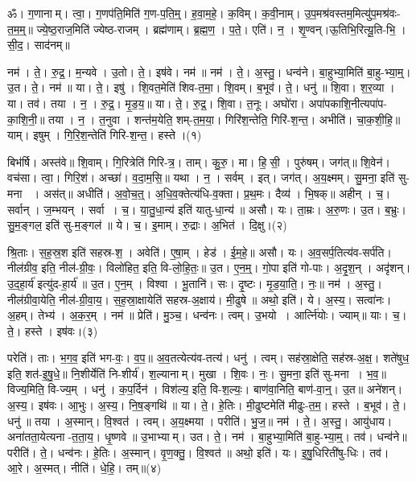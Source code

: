 
ॐ। ग॒णानाम्। त्वा॒। ग॒णप॑ति॒मिति॑ ग॒ण-प॒ति॒म्॒। ह॒वा॒म॒हे॒। क॒विम्। क॒वी॒नाम्। उ॒प॒मश्र॑वस्तम॒मित्यु॑प॒मश्र॑वः-त॒म॒म्॒॥ 
ज्ये॒ष्ठ॒राज॒मिति॑ ज्येष्ठ-राजम्। ब्रह्म॑णाम्। ब्र॒ह्म॒ण॒। प॒ते॒। एति॑। न॒। शृ॒ण्वन्।ऊ॒तिभि॒रित्यू॒ति-भि॒। सी॒द॒। साद॑नम्॥ 


नम॑। ते॒। रु॒द्र॒। म॒न्यवे। उ॒तो। ते॒। इष॑वे। नम॑॥ नम॑। ते॒। अ॒स्तु॒। धन्व॑ने। बा॒हुभ्या॒मिति॑ बा॒हु-भ्या॒म्॒। उ॒त। ते॒। नम॑॥ या। ते॒। इषु॑। शि॒वत॒मेति॑ शिव-त॒मा॒। शि॒वम्। ब॒भूव॑। ते॒। धनु॑॥ शि॒वा। श॒र॒व्या। या। तव॑। तया। न॒। रु॒द्र॒। मृ॒ड॒य॒॥ या। ते॒। रु॒द्र॒। शि॒वा। त॒नूः। अघो॑रा। अपा॑पकाशि॒नीत्यपा॑प-का॒शि॒नी॒॥ तया। न॒। त॒नुवा। शन्त॑म॒येति॒ शम्-त॒म॒या॒। गिरि॑श॒न्तेति॒ गिरि॑-श॒न्त॒। अभीति॑। चा॒क॒शी॒हि॒॥ याम्। इषुम्। गि॒रि॒श॒न्तेति॑ गिरि-श॒न्त॒। हस्ते।(१)


बिभ॑र्षि। अस्त॑वे॥ शि॒वाम्। गि॒रित्रेति॑ गिरि-त्र॒। ताम्। कु॒रु॒। मा। हि॒सी॒। पुरु॑षम्। जग॑त्॥ शि॒वेन॑। वच॑सा। त्वा॒। गिरि॒श॑। अच्छा॑। व॒दा॒म॒सि॒॥ यथा। न॒। सर्वम्। इत्। जग॑त्। अ॒य॒क्ष्मम्। सु॒मना॒ इति॑ सु-मना । अस॑त्॥ अधीति॑। अ॒वो॒च॒त्॒। अ॒धि॒व॒क्तेत्य॑धि-व॒क्ता। प्र॒थ॒मः। दैव्य॑। भि॒षक्॥ अहीन्। च॒। सर्वान्। ज॒म्भयन्। सर्वा। च॒। या॒तु॒धा॒न्य॑ इति॑ यातु-धा॒न्य॑॥ असौ। यः। ता॒म्रः। अ॒रु॒णः। उ॒त। ब॒भ्रुः। सु॒म॒ङ्गल॒ इति॑ सु-म॒ङ्गल॑॥ ये। च॒। इ॒माम्। रु॒द्राः। अ॒भित॑। दि॒क्षु।(२)


श्रि॒ताः। स॒ह॒स्र॒श इति॑ सहस्र-श॒। अवेति॑। ए॒षा॒म्। हेड॑। ई॒म॒हे॒॥ असौ। यः। अ॒व॒सर्प॒तित्य॑व-सर्प॑ति। नील॑ग्रीव॒ इति॒ नील॑-ग्री॒वः॒। विलो॑हित॒ इति॒ वि-लो॒हि॒तः॒॥ उ॒त। ए॒न॒म्॒। गो॒पा इति॑ गो-पाः। अ॒दृ॒श॒न्। अदृ॑शन्। उ॒द॒हा॒र्य॑ इत्यु॑द-हा॒र्य॑॥ उ॒त। ए॒न॒म्। विश्वा। भू॒तानि॑। सः। दृ॒ष्टः। मृ॒ड॒या॒ति॒। नः॒॥ नम॑। अ॒स्तु॒। नील॑ग्रीवा॒येति॒ नील॑-ग्री॒वा॒य॒। स॒ह॒स्रा॒क्षायेति॑ सहस्र-अ॒क्षाय॑। मी॒ढुषे॥ अथो॒ इति॑। ये। अ॒स्य॒। सत्वा॑नः। अ॒हम्। तेभ्य॑। अ॒क॒र॒म्। नम॑॥ प्रेति॑। मु॒ञ्च॒। धन्व॑नः। त्वम्। उ॒भयो। आर्त्नि॑योः। ज्याम्॥ याः। च॒। ते॒। हस्ते। इष॑वः।(३)


परेति॑। ताः। भ॒ग॒व॒ इति॑ भग-वः॒। व॒प॒॥ अ॒व॒तत्येत्य॑व-तत्य॑। धनु॑। त्वम्। सह॑स्रा॒क्षेति॒ सह॑स्र-अ॒क्ष॒। शते॑षुध॒ इति॒ शत॑-इ॒षु॒धे॒॥ नि॒शीर्येति॑ नि-शीर्य॑। श॒ल्यानाम्। मुखा। शि॒वः। नः॒। सु॒मना॒ इति॑ सु-मना। भ॒व॒॥ विज्य॒मिति॒ वि-ज्य॒म्। धनु॑। क॒प॒र्दिन॑। विश॑ल्य॒ इति॒ वि-श॒ल्यः॒। बाण॑वा॒निति॒ बाण॑-वा॒न्॒। उ॒त॥ अने॑शन्।अ॒स्य॒। इष॑वः। आ॒भुः। अ॒स्य॒। नि॒ष॒ङ्गथि॑॥ या। ते॒। हे॒तिः। मी॒ढुष्टमेति॑ मीढुः-त॒म॒। हस्ते। ब॒भूव॑। ते॒। धनु॑॥ तया। अ॒स्मान्। वि॒श्वत॑। त्वम्। अ॒य॒क्ष्मया। परीति॑। भु॒ज॒॥ नम॑। ते॒। अ॒स्तु॒। आयु॑धाय। अना॑तता॒येत्यना-त॒ता॒य॒। धृ॒ष्णवे॥ उ॒भाभ्याम्। उत। ते॒। नम॑। बा॒हुभ्या॒मिति॑ बा॒हु-भ्या॒म्॒। तव॑। धन्व॑ने॥ परीति॑। ते॒। धन्व॑नः। हे॒तिः। अ॒स्मान्। वृ॒ण॒क्तु॒। वि॒श्वत॑॥ अथो॒ इति॑। यः। इ॒षु॒धिरिती॑षु-धिः। तव॑। आ॒रे। अ॒स्मत्। नीति॑। धे॒हि॒। तम्॥(४)



